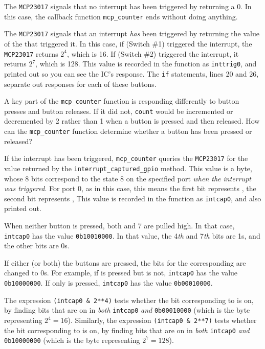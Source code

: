 The \texttt{MCP23017} signals that no interrupt has been triggered by returning a 0.
In this case, the callback function \lstinline{mcp_counter} ends without doing anything.

The \texttt{MCP23017} signals that an interrupt \emph{has} been triggered by returning the value of the \gpio that triggered it.
In this case, if  (Switch \#1) triggered the interrupt, the \texttt{MCP23017} returns $2^4$, which is 16.
If  (Switch \#2) triggered the interrupt, it returns $2^7$, which is 128.
This value is recorded in the function as \lstinline{inttrig0}, and printed out so you can see the IC's response.
The \texttt{if} statements, lines 20 and 26, separate out responses for each of these buttons.

A key part of the \lstinline{mcp_counter} function is responding differently to button presses and button releases.
If it did not, \texttt{count} would be incremented or decremented by 2 rather than 1 when a button is pressed and then released.
How can the \lstinline{mcp_counter} function determine whether a button has been pressed or released?

If the interrupt has been triggered, \lstinline{mcp_counter} queries the \texttt{MCP23017} for the value returned by the \lstinline{interrupt_captured_gpio} method.
This value is a byte, whose 8 bits correspond to the state 8 \gpios on the specified port \emph{when the interrupt was triggered}.
For port 0, as in this case, this means the first bit represents , the second bit represents , \etc
This value is recorded in the function as \lstinline{intcap0}, and also printed out.

When neither button is pressed, both  and 7 are pulled high.
In that case, \lstinline{intcap0} has the value \lstinline{0b10010000}.
In that value, the 4\textit{th} and 7\textit{th} bits are 1s, and the other bits are 0s.

If either (or both) the buttons are pressed, the bits for the corresponding \gpios are changed to 0s.
For example, if  is pressed but  is not, \lstinline{intcap0} has the value \lstinline{0b10000000}.
If only  is pressed, \lstinline{intcap0} has the value \lstinline{0b00010000}.

The expression \lstinline{(intcap0 & 2**4)} tests whether the bit corresponding to  is on, by finding bits that are on in \emph{both} \lstinline{intcap0} \emph{and} \lstinline{0b00010000} (which is the byte representing $2^4 = 16$).
Similarly, the expression \lstinline{(intcap0 & 2**7)} tests whether the bit corresponding to  is on, by finding bits that are on in \emph{both} \lstinline{intcap0} \emph{and} \lstinline{0b10000000} (which is the byte representing $2^7 = 128$).

